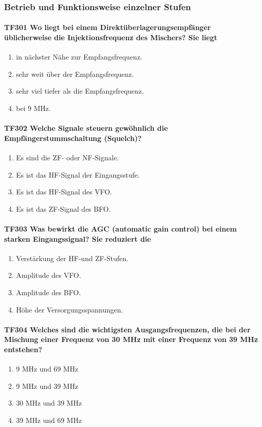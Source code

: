 \documentclass[8pt]{article}
\begin{document}
\pagebreak
\subsubsection{Betrieb und Funktionsweise einzelner Stufen}
\paragraph*{TF301 Wo liegt bei einem Direktüberlagerungsempfänger üblicherweise die Injektionsfrequenz des Mischers? Sie liegt}
\begin{enumerate}[nolistsep,label=\Alph*]
\item in nächster Nähe zur Empfangsfrequenz.
\item sehr weit über der Empfangsfrequenz.
\item sehr viel tiefer als die Empfangsfrequenz.
\item bei 9 MHz.
\end{enumerate}

\paragraph*{TF302 Welche Signale steuern gewöhnlich die Empfängerstummschaltung (Squelch)?}
\begin{enumerate}[nolistsep,label=\Alph*]
\item Es sind die ZF- oder NF-Signale.
\item Es ist das HF-Signal der Eingangsstufe.
\item Es ist das HF-Signal des VFO.
\item Es ist das ZF-Signal des BFO.
\end{enumerate}

\paragraph*{TF303 Was bewirkt die AGC (automatic gain control) bei einem starken Eingangssignal? Sie reduziert die}
\begin{enumerate}[nolistsep,label=\Alph*]
\item Verstärkung der HF-und ZF-Stufen.
\item Amplitude des VFO.
\item Amplitude des BFO.
\item Höhe der Versorgungsspannungen.
\end{enumerate}

\paragraph*{TF304 Welches sind die wichtigsten Ausgangsfrequenzen, die bei der Mischung einer Frequenz von 30 MHz mit einer Frequenz von 39 MHz entstehen?}
\begin{enumerate}[nolistsep,label=\Alph*]
\item 9 MHz und 69 MHz
\item 9 MHz und 39 MHz
\item 30 MHz und 39 MHz
\item 39 MHz und 69 MHz
\end{enumerate}
\end{document}
